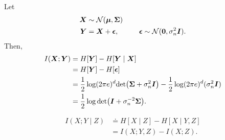 \begin{example}
    Let
    \begin{align*}
        \bm{X} & \sim \mathcal{N}(\bm{\mu},\bm{\Sigma})                                                            \\
        \bm{Y} & = \bm{X}+\bm{\epsilon}, \hspace{1cm} \bm{\epsilon} \sim \mathcal{N}(\bm{0}, \sigma_n^2 \bm{I})
        .\end{align*}
    Then,
    \begin{align*}
        I(\vec{X};\vec{Y}) & = H[\vec{Y}] - H[\vec{Y}\mid \vec{X}]                                                                               \\
                           & = H[\vec{Y}] - H[\vec{\epsilon}]                                                                                    \\
                           & = \frac{1}{2}\log(2\pi e)^d \det{\mat{\Sigma} + \sigma_n^2 \mat{I}} - \frac{1}{2}\log(2\pi e)^d(\sigma_n^2 \mat{I}) \\
                           & = \frac{1}{2} \log \det{\mat{I} + \sigma_n^{-2}\mat{\Sigma}}.
    \end{align*}
\end{example}

\begin{definition}
    \begin{align*}
        I(X;Y\mid Z) & \doteq H[X\mid Z] - H[X\mid Y,Z] \\
                     & = I(X;Y,Z) - I(X;Z).
    \end{align*}
\end{definition}
